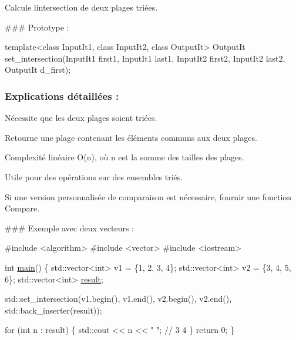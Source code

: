 Calcule l\textquotesingle{}intersection de deux plages triées.

\#\#\# Prototype \+: 
\begin{DoxyCode}
\textcolor{keyword}{template}<\textcolor{keyword}{class} InputIt1, \textcolor{keyword}{class} InputIt2, \textcolor{keyword}{class} OutputIt>
OutputIt set\_intersection(InputIt1 first1, InputIt1 last1,
                          InputIt2 first2, InputIt2 last2,
                          OutputIt d\_first);
\end{DoxyCode}


\subsubsection*{Explications détaillées \+:}


\begin{DoxyItemize}
\item Nécessite que les deux plages soient triées.
\item Retourne une plage contenant les éléments communs aux deux plages.
\item Complexité linéaire O(n), où n est la somme des tailles des plages.
\item Utile pour des opérations sur des ensembles triés.
\item Si une version personnalisée de comparaison est nécessaire, fournir une fonction {\ttfamily Compare}.
\end{DoxyItemize}

\#\#\# Exemple avec deux vecteurs \+: 
\begin{DoxyCode}
\textcolor{preprocessor}{#include <algorithm>}
\textcolor{preprocessor}{#include <vector>}
\textcolor{preprocessor}{#include <iostream>}

\textcolor{keywordtype}{int} \hyperlink{htop_8c_a3c04138a5bfe5d72780bb7e82a18e627}{main}() \{
    std::vector<int> v1 = \{1, 2, 3, 4\};
    std::vector<int> v2 = \{3, 4, 5, 6\};
    std::vector<int> \hyperlink{namespaceconnexion__SSH_ab06475dbad7f16b89c9114749bc95254}{result};

    std::set\_intersection(v1.begin(), v1.end(), v2.begin(), v2.end(),
                          std::back\_inserter(result));

    \textcolor{keywordflow}{for} (\textcolor{keywordtype}{int} n : result) \{
        std::cout << n << \textcolor{stringliteral}{" "}; \textcolor{comment}{// 3 4}
    \}
    \textcolor{keywordflow}{return} 0;
\}
\end{DoxyCode}
 



